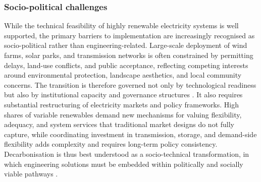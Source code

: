 \subsubsection*{Socio-political challenges}
While the technical feasibility of highly renewable electricity systems is well supported, the primary barriers to implementation are increasingly recognised as socio-political rather than engineering-related. Large-scale deployment of wind farms, solar parks, and transmission networks is often constrained by permitting delays, land-use conflicts, and public acceptance, reflecting competing interests around environmental protection, landscape aesthetics, and local community concerns. The transition is therefore governed not only by technological readiness but also by institutional capacity and governance structures \cite{IEA_NetZero2021, WorldBank_Minerals2020}.
\newline It also requires substantial restructuring of electricity markets and policy frameworks. High shares of variable renewables demand new mechanisms for valuing flexibility, adequacy, and system services that traditional market designs do not fully capture, while coordinating investment in transmission, storage, and demand-side flexibility adds complexity and requires long-term policy consistency. Decarbonisation is thus best understood as a socio-technical transformation, in which engineering solutions must be embedded within politically and socially viable pathways \cite{IEA_NetZero2021}.

